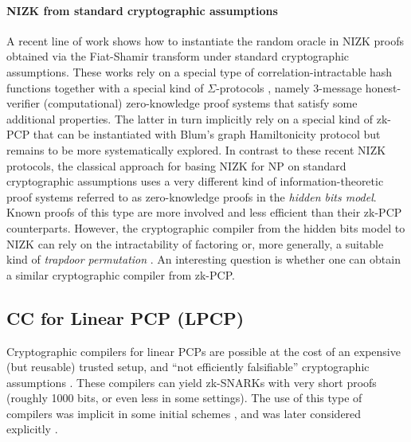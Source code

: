 \paragraph{NIZK from standard cryptographic assumptions}
A recent line of work shows how to instantiate the random oracle in NIZK proofs obtained via the Fiat-Shamir transform under standard cryptographic assumptions.  
These works rely on a special type of correlation-intractable hash functions \cite{1998:CGH:RO-revisited}
together with a special kind of $\Sigma$-protocols \cite{2010:Dam:on-sigma-protocols}, namely 3-message honest-verifier (computational) zero-knowledge proof systems that satisfy some additional properties. 
The latter in turn implicitly rely on a special kind of zk-PCP that can be instantiated with Blum's graph Hamiltonicity protocol \cite{1987:blum:how-to-prove}
but remains to be more systematically explored. 
In contrast to these recent NIZK protocols, the classical approach \cite{1999:FLS:multiple-NIZKPs-under-general-assumptions} for basing NIZK for NP on standard cryptographic assumptions uses a very different kind of information-theoretic proof systems referred to as zero-knowledge proofs in the {\em hidden bits model}. 
Known proofs of this type are more involved and less efficient than their zk-PCP counterparts. 
However, the cryptographic compiler from the hidden bits model to NIZK can rely on the intractability of factoring or, more generally, a suitable kind of {\em trapdoor permutation} \cite{2018:CL:certifying-trapdoor-permutations}. 
An interesting question is whether one can obtain a similar cryptographic compiler from zk-PCP.



\subsection{CC for Linear PCP (LPCP)}
\label{sec:CC-LPCP}

Cryptographic compilers for linear PCPs are possible at the cost of an expensive (but reusable) trusted setup, and ``not efficiently falsifiable'' cryptographic assumptions \cite{2003:Naor:on-crypto-assumptions}.
These compilers can yield zk-SNARKs with very short proofs (roughly 1000 bits, or even less in some settings). 
The use of this type of compilers was implicit in some initial schemes \cite{2010:Gro:short-pairing-based-NIZKA,2011:Lip:Progression-Free}, and was later considered explicitly \cite{2013:tcc:snargs-via-LIPs,2013:GGPR:eurocrypt:QSPs-and-succinct-NIZKs-without-PCPs}.
\loosen


